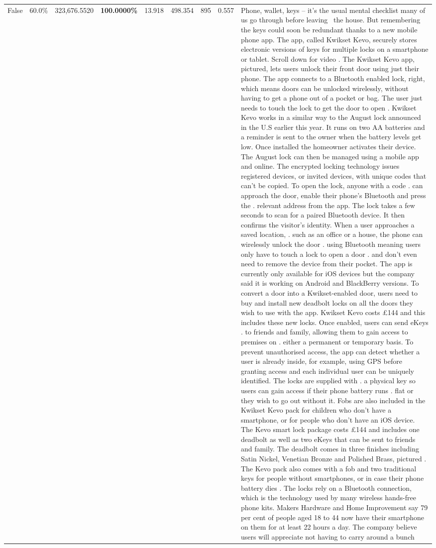 \begin{table}[H]
\begin{tabular}{lllrlllll}
False & 60.0\% & 323,676.5520 & \bfseries \color{red} 100.0000\% & 13.918 & 498.354 & 895 & 0.557 & Phone, wallet, keys – it’s the usual mental checklist many of us go through before leaving  the house. But remembering the keys could soon be redundant thanks to a new mobile phone app. The app, called Kwikset Kevo, securely stores electronic versions of keys for multiple locks on a smartphone or tablet. Scroll down for video . The Kwikset Kevo app, pictured, lets users unlock their front door using just their phone. The app connects to a Bluetooth enabled lock, right, which means doors can be unlocked wirelessly, without having to get a phone out of a pocket or bag. The user just needs to touch the lock to get the door to open . Kwikset Kevo works in a similar way to the August lock announced in the U.S earlier this year. It runs on two AA batteries and a reminder is sent to the owner when the battery levels get low. Once installed the homeowner activates their device. The August lock can then be managed using a mobile app and online. The encrypted locking technology issues registered devices, or invited devices, with unique codes that can't be copied. To open the lock, anyone with a code . can approach the door, enable their phone's Bluetooth and press the . relevant address from the app. The lock takes a few seconds to scan for a paired Bluetooth device. It then confirms the visitor's identity. When a user approaches a saved location, . such as an office or a house, the phone can wirelessly unlock the door . using Bluetooth meaning users only have to touch a lock to open a door . and don't even need to remove the device from their pocket. The app is currently only available for iOS devices but the company said it is working on Android and BlackBerry versions. To convert a door into a Kwikset-enabled door, users need to buy and install new deadbolt locks on all the doors they wish to use with the app. Kwikset Kevo costs £144 and this includes these new locks. Once enabled, users can send eKeys . to friends and family, allowing them to gain access to premises on . either a permanent or temporary basis. To prevent unauthorised access, the app can detect whether a user is already inside, for example, using GPS before granting access and each individual user can be uniquely identified. The locks are supplied with . a physical key so users can gain access if their phone battery runs . flat or they wish to go out without it. Fobs are also included in the Kwikset Kevo pack for children who don't have a smartphone, or for people who don't have an iOS device. The Kevo smart lock package costs £144 and includes one deadbolt as well as two eKeys that can be sent to friends and family. The deadbolt comes in three finishes including Satin Nickel, Venetian Bronze and Polished Brass, pictured . The Kevo pack also comes with a fob and two traditional keys for people without smartphones, or in case their phone battery dies . The locks rely on a Bluetooth connection, which is the technology used by many wireless hands-free phone kits. Makers Hardware and Home Improvement say 79 per cent of people aged 18 to 44 now have their smartphone on them for at least 22 hours a day. The company believe users will appreciate not having to carry around a bunch 
\end{tabular}
\end{table}
